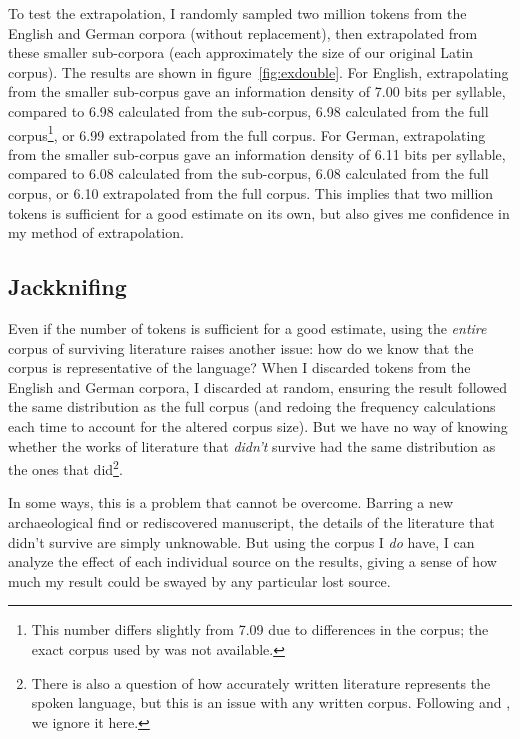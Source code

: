 \documentclass[12pt,twoside,leqno]{article} %
\begin{document}
To test the extrapolation, I randomly sampled two million tokens from the English and German corpora (without replacement), then extrapolated from these smaller sub-corpora (each approximately the size of our original Latin corpus). The results are shown in figure~\ref{fig:exdouble}. For English, extrapolating from the smaller sub-corpus gave an information density of 7.00 bits per syllable, compared to 6.98 calculated from the sub-corpus, 6.98 calculated from the full corpus\footnote{This number differs slightly from  7.09 due to differences in the corpus; the exact corpus used by \citeauthor{oh} was not available.}, or 6.99 extrapolated from the full corpus. For German, extrapolating from the smaller sub-corpus gave an information density of 6.11 bits per syllable, compared to 6.08 calculated from the sub-corpus, 6.08 calculated from the full corpus, or 6.10 extrapolated from the full corpus. This implies that two million tokens is sufficient for a good estimate on its own, but also gives me confidence in my method of extrapolation.

\subsection{Jackknifing}

Even if the number of tokens is sufficient for a good estimate, using the \emph{entire} corpus of surviving literature raises another issue: how do we know that the corpus is representative of the language? When I discarded tokens from the English and German corpora, I discarded at random, ensuring the result followed the same distribution as the full corpus (and redoing the frequency calculations each time to account for the altered corpus size). But we have no way of knowing whether the works of literature that \emph{didn't} survive had the same distribution as the ones that did\footnote{There is also a question of how accurately written literature represents the spoken language, but this is an issue with any written corpus. Following \citereset\citet{oh} and \citet{coupé}, we ignore it here.}. %

In some ways, this is a problem that cannot be overcome. Barring a new archaeological find or rediscovered manuscript, the details of the literature that didn't survive are simply unknowable. But using the corpus I \emph{do} have, I can analyze the effect of each individual source on the results, giving a sense of how much my result could be swayed by any particular lost source.
\end{document}
